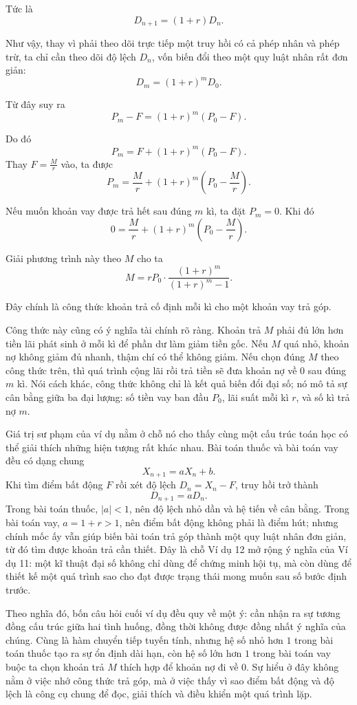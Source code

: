 {    Tức là
    $$
    D_{n+1}=(1+r)D_n.
    $$

    Như vậy, thay vì phải theo dõi trực tiếp một truy hồi có cả phép nhân và phép trừ, ta chỉ cần theo dõi độ lệch $D_n$, vốn biến đổi theo một quy luật nhân rất đơn giản:
    $$
    D_m=(1+r)^mD_0.
    $$

    Từ đây suy ra
    $$
    P_m-F=(1+r)^m(P_0-F).
    $$

    Do đó
    $$
    P_m=F+(1+r)^m(P_0-F).
    $$
    Thay $F=\frac{M}{r}$ vào, ta được
    $$
    P_m=\frac{M}{r}+(1+r)^m\left(P_0-\frac{M}{r}\right).
    $$

    Nếu muốn khoản vay được trả hết sau đúng $m$ kì, ta đặt $P_m=0$. Khi đó
    $$
    0=\frac{M}{r}+(1+r)^m\left(P_0-\frac{M}{r}\right).
    $$

    Giải phương trình này theo $M$ cho ta
    $$
    M=rP_0\cdot \frac{(1+r)^m}{(1+r)^m-1}.
    $$

    Đây chính là công thức khoản trả cố định mỗi kì cho một khoản vay trả góp.

    Công thức này cũng có ý nghĩa tài chính rõ ràng. Khoản trả $M$ phải đủ lớn hơn tiền lãi phát sinh ở mỗi kì để phần dư làm giảm tiền gốc. Nếu $M$ quá nhỏ, khoản nợ không giảm đủ nhanh, thậm chí có thể không giảm. Nếu chọn đúng $M$ theo công thức trên, thì quá trình cộng lãi rồi trả tiền sẽ đưa khoản nợ về $0$ sau đúng $m$ kì. Nói cách khác, công thức không chỉ là kết quả biến đổi đại số; nó mô tả sự cân bằng giữa ba đại lượng: số tiền vay ban đầu $P_0$, lãi suất mỗi kì $r$, và số kì trả nợ $m$.

    Giá trị sư phạm của ví dụ nằm ở chỗ nó cho thấy cùng một cấu trúc toán học có thể giải thích những hiện tượng rất khác nhau. Bài toán thuốc và bài toán vay đều có dạng chung
    $$
    X_{n+1}=aX_n+b.
    $$
    Khi tìm điểm bất động $F$ rồi xét độ lệch $D_n=X_n-F$, truy hồi trở thành
    $$
    D_{n+1}=aD_n.
    $$
    Trong bài toán thuốc, $|a|<1$, nên độ lệch nhỏ dần và hệ tiến về cân bằng. Trong bài toán vay, $a=1+r>1$, nên điểm bất động không phải là điểm hút; nhưng chính mốc ấy vẫn giúp biến bài toán trả góp thành một quy luật nhân đơn giản, từ đó tìm được khoản trả cần thiết. Đây là chỗ Ví dụ 12 mở rộng ý nghĩa của Ví dụ 11: một kĩ thuật đại số không chỉ dùng để chứng minh hội tụ, mà còn dùng để thiết kế một quá trình sao cho đạt được trạng thái mong muốn sau số bước định trước.

    Theo nghĩa đó, bốn câu hỏi cuối ví dụ đều quy về một ý: cần nhận ra sự tương đồng cấu trúc giữa hai tình huống, đồng thời không được đồng nhất ý nghĩa của chúng. Cùng là hàm chuyển tiếp tuyến tính, nhưng hệ số nhỏ hơn $1$ trong bài toán thuốc tạo ra sự ổn định dài hạn, còn hệ số lớn hơn $1$ trong bài toán vay buộc ta chọn khoản trả $M$ thích hợp để khoản nợ đi về $0$. Sự hiểu ở đây không nằm ở việc nhớ công thức trả góp, mà ở việc thấy vì sao điểm bất động và độ lệch là công cụ chung để đọc, giải thích và điều khiển một quá trình lặp.
  }

